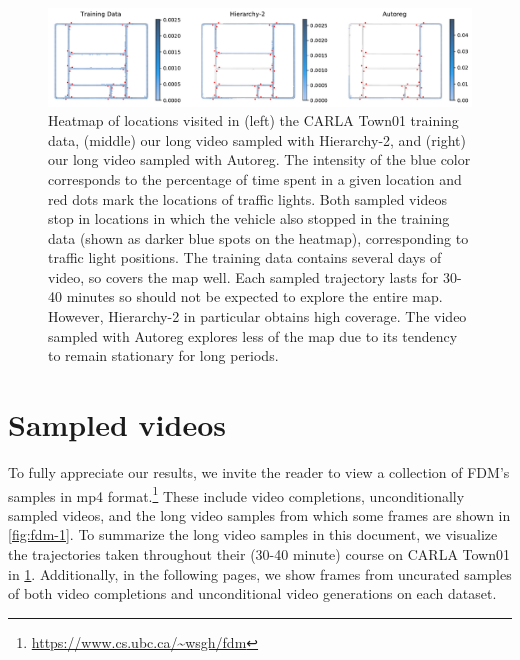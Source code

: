 \begin{figure}
    \centering
    \includegraphics[width=\textwidth]{figs/fdm/heatmap.pdf}
    \vspace{-.3cm}
    \caption{Heatmap of locations visited in (left) the CARLA Town01 training data, (middle) our long video sampled with Hierarchy-2, and (right) our long video sampled with Autoreg. The intensity of the blue color corresponds to the percentage of time spent in a given location and red dots mark the locations of traffic lights. Both sampled videos stop in locations in which the vehicle also stopped in the training data (shown as darker blue spots on the heatmap), corresponding to traffic light positions. The training data contains several days of video, so covers the map well. Each sampled trajectory lasts for 30-40 minutes so should not be expected to explore the entire map. However, Hierarchy-2 in particular obtains high coverage. The video sampled with Autoreg explores less of the map due to its tendency to remain stationary for long periods.  }
    \vspace{-.3cm}
    \label{fig:fdm-carla-long-video-heatmap}
\end{figure}



\section{Sampled videos}
To fully appreciate our results, we invite the reader to view a collection of FDM's samples in mp4 format.\footnote{\url{https://www.cs.ubc.ca/~wsgh/fdm}} These include video completions, unconditionally sampled videos, and the long video samples from which some frames are shown in \cref{fig:fdm-1}. To summarize the long video samples in this document, we visualize the trajectories taken throughout their (30-40 minute) course on CARLA Town01 in \cref{fig:fdm-carla-long-video-heatmap}.
Additionally, in the following pages, we show frames from uncurated samples of both video completions and unconditional video generations on each dataset.





